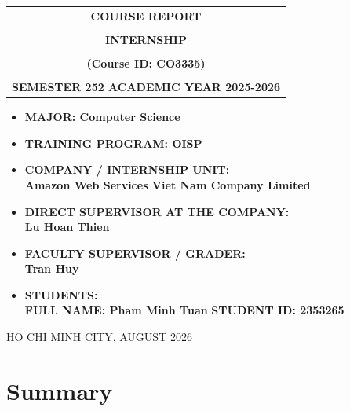 \documentclass[a4paper,12pt]{article}
\newcommand{\coverbig}{\fontsize{18}{22}\selectfont}
\newcommand{\cover}{\fontsize{15}{19}\selectfont}
\newcommand{\coverlistspacing}{%
  \setlength{\topsep}{0pt}\setlength{\parskip}{0pt}%
  \setlength{\itemsep}{3pt}\setlength{\parsep}{0pt}%
}
\begin{document}
\begin{titlepage}
\begin{center}
\begin{tabular}{c}
\multicolumn{1}{c}{\textbf{{\coverbig COURSE REPORT}}}\\
\\{\textbf{{\coverbig INTERNSHIP}}}\\
\\{\textbf{{\coverbig (Course ID: CO3335)}}}
\\
\\
\textbf{\cover SEMESTER 252 ACADEMIC YEAR 2025-2026} \\
\end{tabular}
\end{center}
\vspace{0.2cm}
\begin{itemize}
\renewcommand\labelitemi{--}
\coverlistspacing
    \item \cover \textbf{MAJOR: Computer Science}
    \item \cover \textbf{TRAINING PROGRAM: OISP}
\end{itemize}
\vspace{0.35cm}
\begin{itemize}
\renewcommand\labelitemi{--}
\coverlistspacing
    \item \cover \textbf{COMPANY / INTERNSHIP UNIT:}
    \\ \cover \textbf{Amazon Web Services Viet Nam Company Limited}
    \item \cover \textbf{DIRECT SUPERVISOR AT THE COMPANY:}
    \\ \cover \textbf{Lu Hoan Thien}
    \item \cover \textbf{FACULTY SUPERVISOR / GRADER:}
    \\ \cover \textbf{Tran Huy}
    \item \cover \textbf{STUDENTS:}
    \\ \cover \textbf{FULL NAME: Pham Minh Tuan} \textbf{STUDENT ID: 2353265}
\end{itemize}
\enlargethispage{1.3cm}
\vfill
\begin{center}
{\cover HO CHI MINH CITY, AUGUST 2026}
\end{center}
\vspace{0.5cm}
\end{titlepage}

\newpage
\renewcommand{\contentsname}{Contents}
\renewcommand{\figurename}{Figure}
\renewcommand{\tablename}{Table}
\tableofcontents
\newpage





\newpage
\section{Summary}

\end{document}
